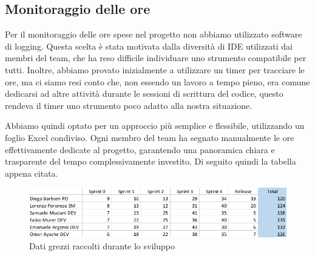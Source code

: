 \documentclass{article}
\begin{document}
\subsection{Monitoraggio delle ore}
Per il monitoraggio delle ore spese nel progetto non abbiamo utilizzato software di logging. Questa scelta è stata motivata dalla diversità di 
IDE utilizzati dai membri del team, che ha reso difficile individuare uno strumento compatibile per tutti. Inoltre, abbiamo provato inizialmente 
a utilizzare un timer per tracciare le ore, ma ci siamo resi conto che, non essendo un lavoro a tempo pieno, era comune dedicarsi ad altre 
attività durante le sessioni di scrittura del codice, questo rendeva il timer uno strumento poco adatto alla nostra situazione.

Abbiamo quindi optato per un approccio più semplice e flessibile, utilizzando un foglio Excel condiviso. Ogni membro del team ha segnato manualmente 
le ore effettivamente dedicate al progetto, garantendo una panoramica chiara e trasparente del tempo complessivamente investito. Di seguito quindi 
la tabella appena citata.

\begin{figure}[H]
    \centering
    \includegraphics[width=1\textwidth]{report-logging_raw}
    \caption{Dati grezzi raccolti durante lo sviluppo}
    \label{fig:logging}
\end{figure}
\end{document}
